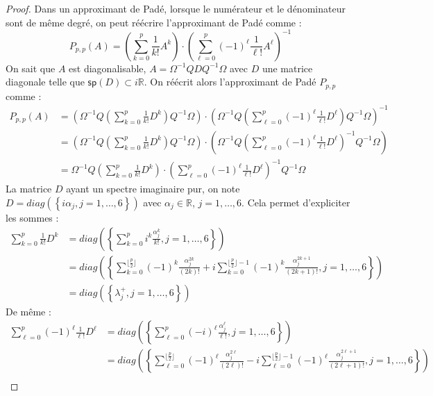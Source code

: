 \begin{proof}
  Dans un approximant de Padé, lorsque le numérateur et le dénominateur sont de même degré, on peut réécrire l'approximant de Padé comme :
  $$
    P_{p,p}(A) = \left( \sum_{k=0}^p \frac{1}{k!}A^k \right)\cdot\left( \sum_{\ell=0}^p (-1)^\ell\frac{1}{\ell!}A^\ell \right)^{-1}
  $$
  On sait que $A$ est diagonalisable, $A=\Omega^{-1}Q D Q^{-1}\Omega$ avec $D$ une matrice diagonale telle que $\mathsf{sp}(D)\subset i\mathbb{R}$. On réécrit alors l'approximant de Padé $P_{p,p}$ comme :
  $$
    \begin{aligned}
      P_{p,p}(A) &= \left( \Omega^{-1}Q \left( \sum_{k=0}^p \frac{1}{k!}D^k \right) Q^{-1}\Omega \right)
                      \cdot
                    \left( \Omega^{-1}Q \left(\sum_{\ell=0}^p (-1)^\ell \frac{1}{\ell!}D^\ell \right) Q^{-1}\Omega \right)^{-1} \\
                 &= \left( \Omega^{-1}Q \left( \sum_{k=0}^p \frac{1}{k!}D^k \right) Q^{-1}\Omega \right)
                      \cdot
                    \left( \Omega^{-1}Q \left(\sum_{\ell=0}^p (-1)^\ell \frac{1}{\ell!}D^\ell \right)^{-1} Q^{-1}\Omega \right) \\
                 &= \Omega^{-1}Q \left( \sum_{k=0}^p \frac{1}{k!}D^k \right) \cdot \left(\sum_{\ell=0}^p (-1)^\ell \frac{1}{\ell!}D^\ell \right)^{-1} Q^{-1}\Omega
    \end{aligned}
  $$
  La matrice $D$ ayant un spectre imaginaire pur, on note $D = diag\left(\left\{ i\alpha_j, j=1,\dots,6 \right\}\right)$ avec $\alpha_j\in\mathbb{R}$, $j=1,\dots,6$. Cela permet d'expliciter les sommes :
  $$
    \begin{aligned}
      \sum_{k=0}^p \frac{1}{k!}D^k & = diag\left(\left\{ \sum_{k=0}^p i^k\frac{\alpha_j^k}{k!} , j=1,\dots,6 \right\}\right) \\
                                   & = diag\left(\left\{ \sum_{k=0}^{\lfloor\frac{p}{2}\rfloor}(-1)^k\frac{\alpha_j^{2k}}{(2k)!} + i\sum_{k=0}^{\lfloor\frac{p}{2}\rfloor-1}(-1)^k\frac{\alpha_j^{2k+1}}{(2k+1)!} , j=1,\dots,6 \right\}\right) \\
                                   & = diag\left(\left\{ \lambda^+_j , j=1,\dots,6 \right\}\right)
    \end{aligned}
  $$
  De même :
  $$
    \begin{aligned}
      \sum_{\ell=0}^p (-1)^\ell\frac{1}{\ell!}D^\ell & = diag\left(\left\{ \sum_{\ell=0}^p(-i)^\ell\frac{\alpha_j^\ell}{\ell!} , j=1,\dots,6 \right\}\right) \\
                                                     & = diag\left(\left\{ \sum_{\ell=0}^{\lfloor\frac{p}{2}\rfloor}(-1)^\ell\frac{\alpha_j^{2\ell}}{(2\ell)!} - i\sum_{\ell=0}^{\lfloor\frac{p}{2}\rfloor-1}(-1)^\ell\frac{\alpha_j^{2\ell+1}}{(2\ell+1)!} , j=1,\dots,6 \right\}\right) \\

\end{aligned}$$
\end{proof}
